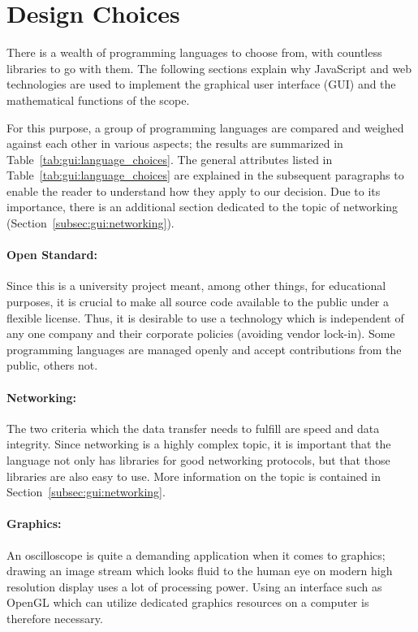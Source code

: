 \section{Design Choices} %
\label{sec:gui:design_choices}

There is  a wealth  of programming  languages to  choose from,  with countless
libraries to go  with them. The following sections explain  why JavaScript and
web technologies are used to implement  the graphical user interface (GUI) and
the mathematical functions of the scope. 

For  this  purpose,  a  group   of  programming  languages  are  compared  and
weighed  against each  other in  various aspects;  the results  are summarized
in   Table~\ref{tab:gui:language_choices}.  The   general  attributes   listed
in  Table~\ref{tab:gui:language_choices}  are   explained  in  the  subsequent
paragraphs to enable the reader to  understand how they apply to our decision.
Due to its  importance, there is an additional section  dedicated to the topic
of networking (Section~\ref{subsec:gui:networking}).

\paragraph{Open  Standard:} Since this  is a  university project  meant, among
other things, for educational purposes, it  is crucial to make all source code
available to the public under a flexible license. Thus, it is desirable to use
a  technology which  is independent  of any  one company  and their  corporate
policies  (avoiding vendor  lock-in). Some programming  languages are  managed
openly and accept contributions from the public, others not.

\paragraph{Networking:} The  two criteria  which  the data  transfer needs  to
fulfill are  speed and data integrity.   Since networking is a  highly complex
topic,  it is  important that  the language  not only  has libraries  for good
networking  protocols, but  that those  libraries are  also easy  to use. More
information on the topic is contained in Section~\ref{subsec:gui:networking}.

\paragraph{Graphics:} An oscilloscope is quite a demanding application when it
comes to graphics; drawing an image stream  which looks fluid to the human eye
on modern  high resolution display  uses a  lot of processing  power. Using an
interface such as  OpenGL which can utilize dedicated graphics  resources on a
computer is therefore necessary.

